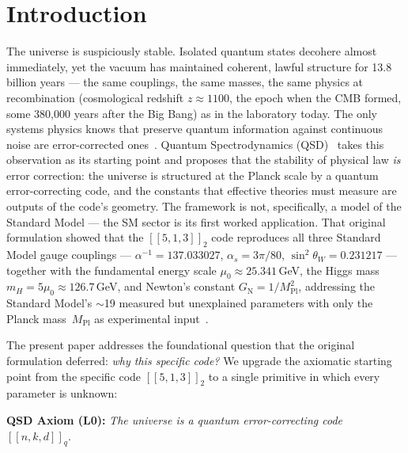 \documentclass[11pt,a4paper]{article}
\newcommand{\Cq}[4]{[\![#1,#2,#3]\!]_{#4}}
\providecommand{\Mpl}{M_{\mathrm{Pl}}}
\providecommand{\murad}{\mu_0}
\providecommand{\GN}{G_{\mathrm{N}}}
\begin{document}
\newpage
\tableofcontents
\newpage

\section{Introduction}
\label{sec:intro}

The universe is suspiciously stable. Isolated quantum states decohere almost immediately, yet the vacuum has maintained coherent, lawful structure for 13.8 billion years --- the same couplings, the same masses, the same physics at recombination (cosmological redshift $z\approx1100$, the epoch when the CMB formed, some 380{,}000 years after the Big Bang) as in the laboratory today. The only systems physics knows that preserve quantum information against continuous noise are error-corrected ones~\cite{Shor1995,Steane1996}. Quantum Spectrodynamics (QSD)~\cite{Hubka2026QSD} takes this observation as its starting point and proposes that the stability of physical law \emph{is} error correction: the universe is structured at the Planck scale by a quantum error-correcting code, and the constants that effective theories must measure are outputs of the code's geometry. The framework is not, specifically, a model of the Standard Model --- the SM sector is its first worked application. That original formulation showed that the $\Cq{5}{1}{3}{2}$ code reproduces all three Standard Model gauge couplings --- $\alpha^{-1}=137.033027$, $\alpha_s = 3\pi/80$, $\sin^2\theta_W = 0.231217$ --- together with the fundamental energy scale $\murad\approx 25.341$\,GeV, the Higgs mass $m_H = 5\murad \approx 126.7$\,GeV, and Newton's constant $\GN = 1/\Mpl^2$, addressing the Standard Model's $\sim$19 measured but unexplained parameters with only the Planck mass~$\Mpl$ as experimental input~\cite{Hubka2026QSD,Hubka2026QSDSupp}.

The present paper addresses the foundational question that the original formulation deferred: \emph{why this specific code?} We upgrade the axiomatic starting point from the specific code $\Cq{5}{1}{3}{2}$ to a single primitive in which every parameter is unknown:

\begin{mdframed}[backgroundcolor=axiombg,linecolor=axiomcol,
  linewidth=2pt, skipabove=8pt, skipbelow=8pt]
\textbf{QSD Axiom (L0):}\quad
\emph{The universe is a quantum error-correcting code} $\Cq{n}{k}{d}{q}$.
\end{mdframed}
\end{document}
